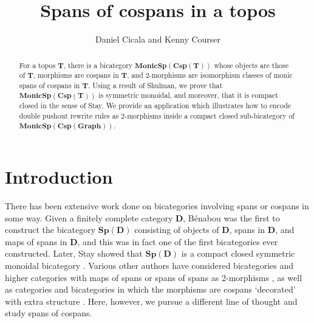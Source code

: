 \documentclass{tac}
\newcommand{\cat}[1]{\mathbf{#1}}
\newcommand{\bispmap}[1]{\mathbf{Sp(#1)}}
\theoremstyle{remark}
\theoremstyle{definition}
\begin{document}
\sloppy	

\title{Spans of cospans in a topos}
\author{Daniel Cicala and Kenny Courser}
\maketitle

\address{Department of Mathematics, University of California\\
 Riverside, CA 92521, USA\\[5pt]}


\begin{abstract}
For a topos $\cat{T}$, 
there is a bicategory
$\cat{MonicSp(Csp(T))}$ 
whose objects are those of $\mathbf{T}$,
morphisms are cospans in $\mathbf{T}$, 
and 2-morphisms are 
isomorphism classes of monic spans of cospans 
in $\mathbf{T}$. 
Using a result of Shulman, 
we prove that $\cat{MonicSp(Csp(T))}$ is 
symmetric monoidal, and moreover, that it is compact closed in the sense of Stay.
We provide an application which illustrates how
to encode double pushout rewrite rules
as $2$-morphisms inside a compact closed sub-bicategory of
$\mathbf{MonicSp(Csp(Graph))}$.
\end{abstract}



\section{Introduction} 
\label{sec:Introduction}

There has been extensive work done on bicategories involving spans or cospans in some way.
Given a finitely complete category $\cat{D}$,
B\'{e}nabou \cite{Be} 
was the first to construct the bicategory
$\bispmap{D}$ consisting of
objects of $\cat{D}$, spans in $\cat{D}$,
and maps of spans in $\cat{D}$, and this was in fact one of the 
first bicategories ever constructed.
Later, Stay showed that $\bispmap{D}$ 
is a compact closed symmetric monoidal bicategory
\cite{Stay}.
Various other authors have considered bicategories and higher categories with maps of spans or spans of spans as 2-morphisms \cite{Haug,Hoff,Nie,Reb,Stay}, as well as categories and bicategories in which the morphisms are cospans `decorated' with extra structure \cite{BaezCoyaRebro, BaezFong, BaezFongPollard, BaezPollard,Cour,Fong}.
Here, however, we pursue a different line of thought and study spans of cospans. 
\end{document}

